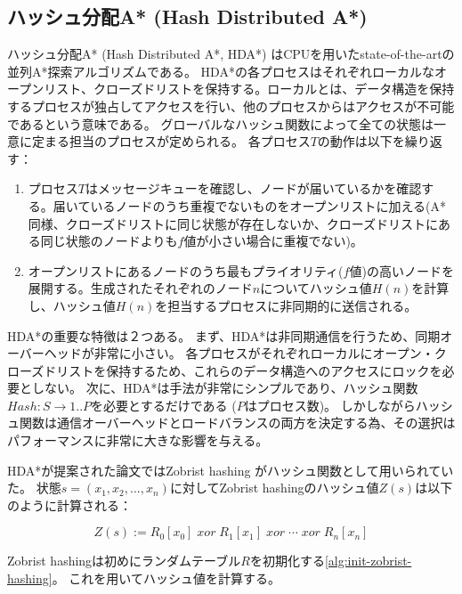 \subsection{ハッシュ分配A* (Hash Distributed A*)}
\label{sec:hash-distributed-astar}

ハッシュ分配A* (Hash Distributed A*, HDA*) \cite{kishimotofb13}はCPUを用いたstate-of-the-artの並列A*探索アルゴリズムである。
HDA*の各プロセスはそれぞれローカルなオープンリスト、クローズドリストを保持する。ローカルとは、データ構造を保持するプロセスが独占してアクセスを行い、他のプロセスからはアクセスが不可能であるという意味である。
グローバルなハッシュ関数によって全ての状態は一意に定まる担当のプロセスが定められる。
各プロセス$T$の動作は以下を繰り返す：

\begin{enumerate}
	\item 
		プロセス$T$はメッセージキューを確認し、ノードが届いているかを確認する。届いているノードのうち重複でないものをオープンリストに加える(A*同様、クローズドリストに同じ状態が存在しないか、クローズドリストにある同じ状態のノードよりも$f$値が小さい場合に重複でない)。
	\item 
		オープンリストにあるノードのうち最もプライオリティ($f$値)の高いノードを展開する。生成されたそれぞれのノード$n$についてハッシュ値$H(n)$を計算し、ハッシュ値$H(n)$を担当するプロセスに非同期的に送信される。
\end{enumerate}

HDA*の重要な特徴は２つある。
まず、HDA*は非同期通信を行うため、同期オーバーヘッドが非常に小さい。
各プロセスがそれぞれローカルにオープン・クローズドリストを保持するため、これらのデータ構造へのアクセスにロックを必要としない。
次に、HDA*は手法が非常にシンプルであり、ハッシュ関数$Hash: S \rightarrow {1..P}$を必要とするだけである ($P$はプロセス数)。
しかしながらハッシュ関数は通信オーバーヘッドとロードバランスの両方を決定する為、その選択はパフォーマンスに非常に大きな影響を与える。

HDA*が提案された論文\cite{kishimotofb13}ではZobrist hashing \cite{zobrist:70}がハッシュ関数として用いられていた。
状態$s = (x_1,x_2,...,x_n)$に対してZobrist hashingのハッシュ値$Z(s)$は以下のように計算される：

\begin{equation}
\label{eq:zobrist}
 	Z(s) := R_{0}[x_{0}]\; xor\; R_{1}[x_{1}]\; xor\; \cdots\; xor\; R_{n}[x_{n}]%
\end{equation}

Zobrist hashingは初めにランダムテーブル$R$を初期化する\ref{alg:init-zobrist-hashing}。
これを用いてハッシュ値を計算する。

